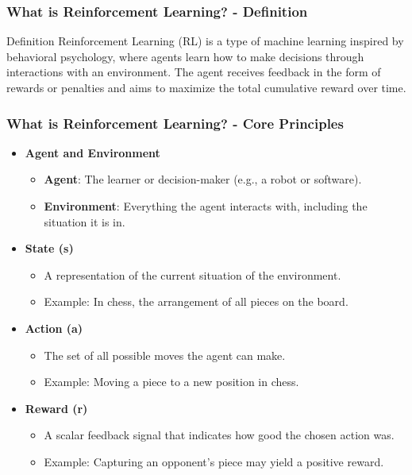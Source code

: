 \documentclass[aspectratio=169]{beamer}
\begin{document}
\begin{frame}[fragile]
    \frametitle{What is Reinforcement Learning? - Definition}
    \begin{block}{Definition}
        Reinforcement Learning (RL) is a type of machine learning inspired by behavioral psychology, where agents learn how to make decisions through interactions with an environment. The agent receives feedback in the form of rewards or penalties and aims to maximize the total cumulative reward over time.
    \end{block}
\end{frame}

\begin{frame}[fragile]
    \frametitle{What is Reinforcement Learning? - Core Principles}
    \begin{itemize}
        \item \textbf{Agent and Environment}
            \begin{itemize}
                \item \textbf{Agent}: The learner or decision-maker (e.g., a robot or software).
                \item \textbf{Environment}: Everything the agent interacts with, including the situation it is in.
            \end{itemize}
        
        \item \textbf{State (s)}
            \begin{itemize}
                \item A representation of the current situation of the environment.
                \item Example: In chess, the arrangement of all pieces on the board.
            \end{itemize}
        
        \item \textbf{Action (a)}
            \begin{itemize}
                \item The set of all possible moves the agent can make.
                \item Example: Moving a piece to a new position in chess.
            \end{itemize}
        
        \item \textbf{Reward (r)}
            \begin{itemize}
                \item A scalar feedback signal that indicates how good the chosen action was.
                \item Example: Capturing an opponent's piece may yield a positive reward.
            \end{itemize}
    \end{itemize}
\end{frame}
\end{document}

